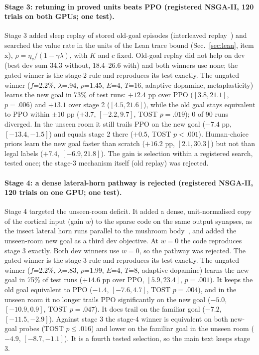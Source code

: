 \documentclass[10pt,onecolumn,letterpaper]{article}
\begin{document}
\paragraph{Stage 3: retuning in proved units beats PPO (registered NSGA-II, 120 trials on both GPUs; one test).} Stage 3
added sleep replay of stored old-goal episodes (interleaved replay~\cite{mcclelland1995}) and searched the value rate in
the units of the Lean trace bound (Sec.~\ref{sec:lean}, item x), $\rho=\eta_v/(1-\gamma\lambda)$, with $K$ and $c$ fixed.
Old-goal replay did not help on dev (best dev sum 34.3 without, 18.4--26.6 with) and both winners use none; the gated
winner is the stage-2 rule and reproduces its test exactly. The ungated winner ($f$=2.2\%, $\lambda$=.94, $\rho$=1.45,
$E$=4, $T$=16, adaptive dopamine, metaplasticity) learns the new goal in 73\% of test runs: $+12.4$ pp over PPO
($[3.8,21.1]$, $p=.006$) and $+13.1$ over stage 2 ($[4.5,21.6]$), while the old goal stays equivalent to PPO within
$\pm10$ pp ($+3.7$, $[-2.2,9.7]$, TOST $p=.019$); 0 of 90 runs diverged. In the unseen room it still trails PPO on the
new goal ($-7.4$ pp, $[-13.4,-1.5]$) and equals stage 2 there ($+0.5$, TOST $p<.001$). Human-choice priors learn the
new goal faster than scratch ($+16.2$ pp, $[2.1,30.3]$) but not than legal labels ($+7.4$, $[-6.9,21.8]$). The gain is
selection within a registered search, tested once; the stage-3 mechanism itself (old replay) was rejected.

\paragraph{Stage 4: a dense lateral-horn pathway is rejected (registered NSGA-II, 120 trials on one GPU; one test).}
Stage 4 targeted the unseen-room deficit. It added a dense, unit-normalised copy of the cortical input (gain $w$) to
the sparse code on the same output synapses, as the insect lateral horn runs parallel to the mushroom
body~\cite{litwinkumar2017}, and added the unseen-room new goal as a third dev objective. At $w=0$ the code
reproduces stage 3 exactly. Both dev winners use $w=0$, so the pathway was rejected. The gated winner is the stage-3 rule and reproduces
its test exactly. The ungated winner ($f$=2.2\%, $\lambda$=.83, $\rho$=1.99, $E$=4, $T$=8, adaptive dopamine) learns the
new goal in 75\% of test runs ($+14.6$ pp over PPO, $[5.9,23.4]$, $p=.001$). It keeps the old goal equivalent to PPO
($-1.4$, $[-7.6,4.7]$, TOST $p=.004$), and in the unseen room it no longer trails PPO significantly on the new goal ($-5.0$, $[-10.9,0.9]$,
TOST $p=.047$). It does trail on the familiar goal ($-7.2$, $[-11.5,-2.9]$). Against stage 3 the stage-4 winner is equivalent on
both new-goal probes (TOST $p\leq.016$) and lower on the familiar goal in the unseen room ($-4.9$, $[-8.7,-1.1]$). It is a fourth tested selection, so the main text keeps stage 3.
\end{document}
